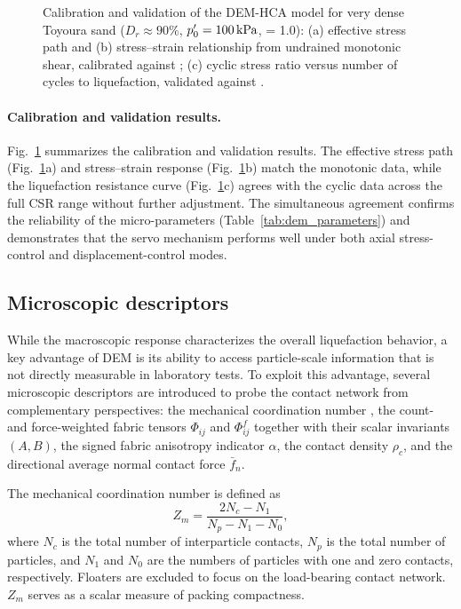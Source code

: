 \begin{figure}
  \centering
  \caption{Calibration and validation of the DEM-HCA model for very dense Toyoura sand ($D_r \approx 90\%$, $p^\prime_0=\SI{100}{kPa}$, \Kzero{} = 1.0): (a) effective stress path and (b) stress--strain relationship from undrained monotonic shear, calibrated against \citet{Nakata1998}; (c) cyclic stress ratio versus number of cycles to liquefaction, validated against \citet{Ishihara1985}.}
  \label{fig:validation_combined}
\end{figure}

\paragraph{Calibration and validation results.}
Fig.~\ref{fig:validation_combined} summarizes the calibration and validation results. The effective stress path (Fig.~\ref{fig:validation_combined}a) and stress--strain response (Fig.~\ref{fig:validation_combined}b) match the monotonic data, while the liquefaction resistance curve (Fig.~\ref{fig:validation_combined}c) agrees with the cyclic data across the full CSR range without further adjustment. The simultaneous agreement confirms the reliability of the micro-parameters (Table~\ref{tab:dem_parameters}) and demonstrates that the servo mechanism performs well under both axial stress-control and displacement-control modes.

\subsection{Microscopic descriptors}
\label{subsec:micro_descriptors}

While the macroscopic response characterizes the overall liquefaction behavior, a key advantage of DEM is its ability to access particle-scale information that is not directly measurable in laboratory tests. To exploit this advantage, several microscopic descriptors are introduced to probe the contact network from complementary perspectives: the mechanical coordination number \Zm{}, the count- and force-weighted fabric tensors $\Phi_{ij}$ and $\Phi^f_{ij}$ together with their scalar invariants $(A, B)$, the signed fabric anisotropy indicator $\alpha$, the contact density $\rho_c$, and the directional average normal contact force $\bar{f}_n$.

The mechanical coordination number \citep{Thornton2000,Oda1977} is defined as
\begin{equation}
Z_m = \frac{2N_c - N_1}{N_p - N_1 - N_0},
\label{eq:zm_definition_method}
\end{equation}
where $N_c$ is the total number of interparticle contacts, $N_p$ is the total number of particles, and $N_1$ and $N_0$ are the numbers of particles with one and zero contacts, respectively. Floaters are excluded to focus on the load-bearing contact network. $Z_m$ serves as a scalar measure of packing compactness.

